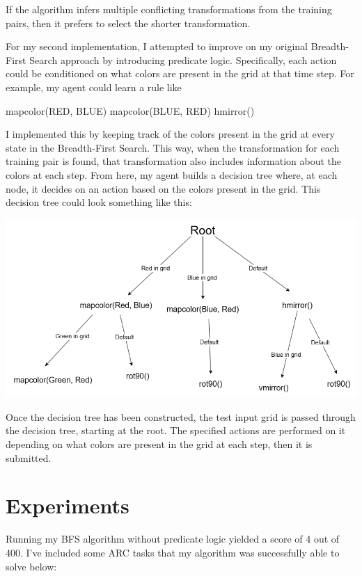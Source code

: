 \documentclass[letterpaper]{article} %
\begin{document}
If the algorithm infers multiple conflicting transformations from the training pairs, then it prefers to select the shorter transformation.

\bigskip\bigskip

For my second implementation, I attempted to improve on my original Breadth-First Search approach by introducing predicate logic. Specifically, each action could be conditioned on what colors are present in the grid at that time step. For example, my agent could learn a rule like


\begin{algorithmic}
        \STATE mapcolor(RED, BLUE)
        \STATE mapcolor(BLUE, RED)
    \ELSE
        \STATE hmirror()
    \ENDIF
\end{algorithmic}

\bigskip

I implemented this by keeping track of the colors present in the grid at every state in the Breadth-First Search. This way, when the transformation for each training pair is found, that transformation also includes information about the colors at each step. From here, my agent builds a decision tree where, at each node, it decides on an action based on the colors present in the grid. This decision tree could look something like this:

\begin{center}
    \includegraphics[width=\hsize]{decision tree.drawio.png}
\end{center}

Once the decision tree has been constructed, the test input grid is passed through the decision tree, starting at the root. The specified actions are performed on it depending on what colors are present in the grid at each step, then it is submitted.

\section{Experiments}
Running my BFS algorithm without predicate logic yielded a score of 4 out of 400. I've included some ARC tasks that my algorithm was successfully able to solve below:
\end{document}
